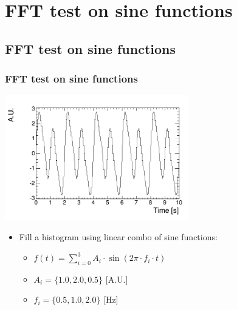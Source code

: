 \documentclass[bigger]{beamer}
\begin{document}
\section{FFT test on sine functions}
\label{sec-2}
\subsection{FFT test on sine functions}
\label{sec-2-1}
\begin{frame}
\frametitle{FFT test on sine functions}
\label{sec-2-1-1}
\label{sec-2-1-1-1}

\centering
\includegraphics[width=0.6\textwidth]{fig/tutorial_original_histogram.png}
\begin{itemize}

\item Fill a histogram using linear combo of sine functions:
\label{sec-2-1-1-2}%
\begin{itemize}

\item \(f(t) = \sum_{i = 0}^3 A_{i} \cdot \sin (2\pi \cdot f_{i} \cdot t)\)
\label{sec-2-1-1-2-1}%

\item \(A_{i} = \{1.0, 2.0, 0.5\}\) [A.U.]
\label{sec-2-1-1-2-2}%

\item \(f_{i} = \{0.5, 1.0, 2.0\}\) [Hz]
\label{sec-2-1-1-2-3}%
\end{itemize} %
\end{itemize} %
\end{frame}
\end{document}
